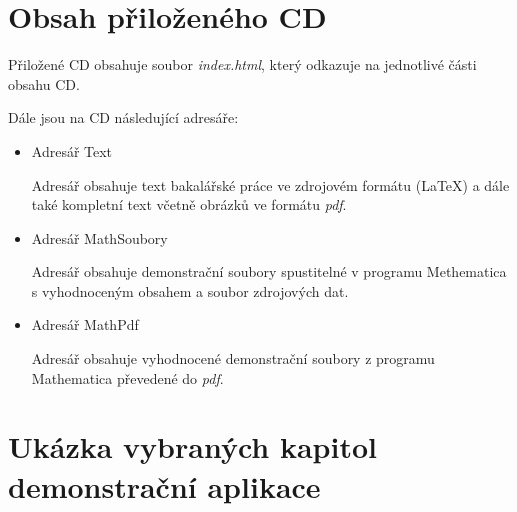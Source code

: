 \documentclass[11pt,twoside,a4paper]{book}
\begin{document}
\appendix

\chapter{Obsah přiloženého CD}
Přiložené CD obsahuje soubor \textit{index.html}, který odkazuje na jednotlivé části obsahu CD. 

Dále jsou na CD následující adresáře:
\begin{itemize}
\item Adresář Text

Adresář obsahuje text bakalářské práce ve zdrojovém formátu (LaTeX) a dále také kompletní text včetně obrázků ve formátu \textit{pdf}.
\item Adresář MathSoubory 

Adresář obsahuje demonstrační soubory spustitelné v programu Methematica s vyhodnoceným obsahem a soubor zdrojových dat.

\item Adresář MathPdf

Adresář obsahuje vyhodnocené demonstrační soubory z programu Mathematica převedené do \textit{pdf}.
\end{itemize}



\chapter{Ukázka vybraných kapitol demonstrační aplikace}


\end{document}

